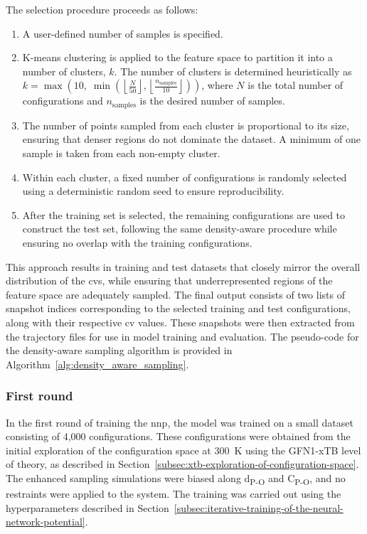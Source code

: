 The selection procedure proceeds as follows:
\begin{enumerate}
    \item A user-defined number of samples is specified.
    \item K-means clustering is applied to the feature space to partition it into a number of clusters, $k$. The number of clusters is determined heuristically as $k = \max\left(10, \; \min\left(\left\lfloor \frac{N}{50} \right\rfloor, \left\lfloor \frac{n_\text{samples}}{10} \right\rfloor \right)\right)$, where $N$ is the total number of configurations and $n_\text{samples}$ is the desired number of samples.
    \item The number of points sampled from each cluster is proportional to its size, ensuring that denser regions do not dominate the dataset. A minimum of one sample is taken from each non-empty cluster.
    \item Within each cluster, a fixed number of configurations is randomly selected using a deterministic random seed to ensure reproducibility.
    \item After the training set is selected, the remaining configurations are used to construct the test set, following the same density-aware procedure while ensuring no overlap with the training configurations.
\end{enumerate}

This approach results in training and test datasets that closely mirror the overall distribution of the \acp{cv}, while ensuring that underrepresented regions of the feature space are adequately sampled. The final output consists of two lists of snapshot indices corresponding to the selected training and test configurations, along with their respective \ac{cv} values. These snapshots were then extracted from the trajectory files for use in model training and evaluation. The pseudo-code for the density-aware sampling algorithm is provided in Algorithm~\ref{alg:density_aware_sampling}.



\subsubsection{First round}
In the first round of training the \ac{nnp}, the model was trained on a small dataset consisting of 4,000 configurations. These configurations were obtained from the initial exploration of the configuration space at 300~K using the GFN1-xTB level of theory, as described in Section~\ref{subsec:xtb-exploration-of-configuration-space}. The enhanced sampling simulations were biased along d\textsubscript{P-O} and C\textsubscript{P-O}, and no restraints were applied to the system. The training was carried out using the hyperparameters described in Section~\ref{subsec:iterative-training-of-the-neural-network-potential}.



